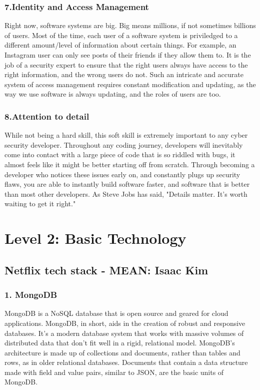 \documentclass[a4paper, 11pt]{report}
\begin{document}
    \subsubsection{7.Identity and Access Management}
    Right now, software systems are big. Big means millions, if not sometimes billions of users. Most of the time, each user of a software system is priviledged to a different amount/level of information about certain things. For example, an Instagram user can only see posts of their friends if they allow them to. It is the job of a security expert to ensure that the right users always have access to the right information, and the wrong users do not. Such an intricate and accurate system of access management requires constant modification and updating, as the way we use software is always updating, and the roles of users are too.
    \subsubsection{8.Attention to detail}
    While not being a hard skill, this soft skill is extremely important to any cyber security developer. Throughout any coding journey, developers will inevitably come into contact with a large piece of code that is so riddled with bugs, it almost feels like it might be better starting off from scratch. Through becoming a developer who notices these issues early on, and constantly plugs up security flaws, you are able to instantly build software faster, and software that is better than most other developers. As Steve Jobs has said, "Details matter. It's worth waiting to get it right." \cite{jake7}



\newpage
\section{Level 2: Basic Technology}

\subsection{Netflix tech stack - MEAN:  Isaac Kim}

\subsubsection{1. MongoDB}
    MongoDB is a NoSQL database that is open source and geared for cloud applications. \cite{isaac8} MongoDB, in short, aids in the creation of robust and responsive databases. It's a modern database system that works with massive volumes of distributed data that don't fit well in a rigid, relational model. MongoDB's architecture is made up of collections and documents, rather than tables and rows, as in older relational databases. \cite{isaac9} Documents that contain a data structure made with field and value pairs, similar to JSON, are the basic units of MongoDB. \cite{isaac9}
\end{document}

